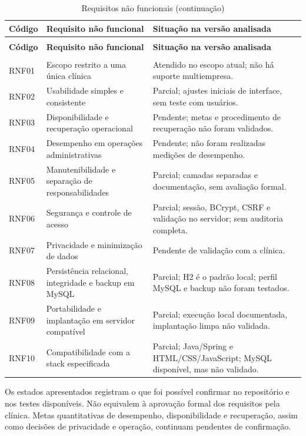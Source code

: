 \documentclass[12pt,a4paper]{article}
\begin{document}
\begingroup\scriptsize
\begin{longtable}{>{\raggedright\arraybackslash}p{1.15cm} >{\raggedright\arraybackslash}p{7.4cm} >{\raggedright\arraybackslash}p{5.7cm}}
\caption{Requisitos não funcionais e situação de validação}\label{tab:rnf}\\
\hline\textbf{Código} & \textbf{Requisito não funcional} & \textbf{Situação na versão analisada}\\
\hline
\endfirsthead
\caption[]{Requisitos não funcionais (continuação)}\\
\hline\textbf{Código} & \textbf{Requisito não funcional} & \textbf{Situação na versão analisada}\\
\hline
\endhead
\hline\multicolumn{3}{r}{Continua na próxima página}\\
\endfoot
\hline
\endlastfoot
RNF01 & Escopo restrito a uma única clínica & Atendido no escopo atual; não há suporte multiempresa.\\
RNF02 & Usabilidade simples e consistente & Parcial; ajustes iniciais de interface, sem teste com usuários.\\
RNF03 & Disponibilidade e recuperação operacional & Pendente; metas e procedimento de recuperação não foram validados.\\
RNF04 & Desempenho em operações administrativas & Pendente; não foram realizadas medições de desempenho.\\
RNF05 & Manutenibilidade e separação de responsabilidades & Parcial; camadas separadas e documentação, sem avaliação formal.\\
RNF06 & Segurança e controle de acesso & Parcial; sessão, BCrypt, CSRF e validação no servidor; sem auditoria completa.\\
RNF07 & Privacidade e minimização de dados & Pendente de validação com a clínica.\\
RNF08 & Persistência relacional, integridade e backup em MySQL & Parcial; H2 é o padrão local; perfil MySQL e backup não foram testados.\\
RNF09 & Portabilidade e implantação em servidor compatível & Parcial; execução local documentada, implantação limpa não validada.\\
RNF10 & Compatibilidade com a stack especificada & Parcial; Java/Spring e HTML/CSS/JavaScript; MySQL disponível, mas não validado.\\
\end{longtable}
\endgroup

Os estados apresentados registram o que foi possível confirmar no repositório e nos testes disponíveis. Não equivalem à aprovação formal dos requisitos pela clínica. Metas quantitativas de desempenho, disponibilidade e recuperação, assim como decisões de privacidade e operação, continuam pendentes de confirmação.
\end{document}
